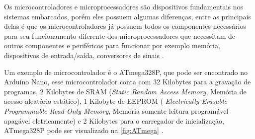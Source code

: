    \par
    Os microcontroladores e microprocessadores são dispositivos fundamentais nos sistemas embarcados, porém eles possuem algumas diferenças,
    entre as principais delas é que os microcontroladores já possuem todos os componentes necessários para seu funcionamento diferente dos microprocessadores que necessitam de outros componentes e periféricos para funcionar por exemplo memória, dispositivos de entrada/saída, conversores de sinais \cite{ayala:1991}.  
    
    \par
    Um exemplo de microcontrolador é o ATmega328P, que pode ser encontrado no Arduíno Nano, esse microcontrolador conta com 32 Kilobytes para a gravação de programas, 2 Kilobytes de SRAM (\textit{Static Random Access Memory}, Memória de acesso aleatório estático), 1 Kilobyte de EEPROM ( \textit{Electrically-Erasable Programmable Read-Only Memory}, Memória somente leitura programável apagável eletricamente) e 2 Kilobytes para o carregador de inicialização, ATmega328P pode ser visualizado na \autoref{fig:ATmega} \cite{arduino}.

